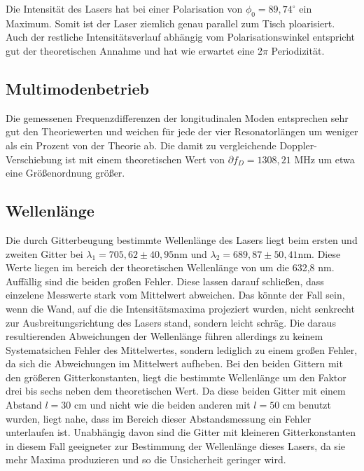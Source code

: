 Die Intensität des Lasers hat bei einer Polarisation von $\phi_0 = 89,74^{\circ}$ ein Maximum.
Somit ist der Laser ziemlich genau parallel zum Tisch ploarisiert. 
Auch der restliche Intensitätsverlauf abhängig vom Polarisationswinkel entspricht gut der theoretischen Annahme 
und hat wie erwartet eine 2$\pi$ Periodizität.


\subsection{Multimodenbetrieb}

Die gemessenen Frequenzdifferenzen der longitudinalen Moden entsprechen sehr gut den Theoriewerten und weichen für jede der 
vier Resonatorlängen um weniger als ein Prozent von der Theorie ab.
Die damit zu vergleichende Doppler-Verschiebung ist mit einem theoretischen Wert von $\partial f_D = 1308,21$ MHz 
um etwa eine Größenordnung größer.


\subsection{Wellenlänge}

Die durch Gitterbeugung bestimmte Wellenlänge des Lasers liegt beim ersten und zweiten Gitter bei 
$\lambda_1 = 705,62 \pm 40,95 \si{\nano\meter}$ und $\lambda_2 = 689,87 \pm 50,41 \si{\nano\meter}$.
Diese Werte liegen im bereich der theoretischen Wellenlänge von um die 632,8 nm.
Auffällig sind die beiden großen Fehler. Diese lassen darauf schließen, dass einzelene Messwerte stark vom Mittelwert abweichen. 
Das könnte der Fall sein, wenn die Wand, auf die die Intensitätsmaxima projeziert wurden, nicht senkrecht zur 
Ausbreitungsrichtung des Lasers stand, sondern leicht schräg. Die daraus resultierenden Abweichungen der Wellenlänge führen allerdings 
zu keinem Systematsichen Fehler des Mittelwertes, sondern lediglich zu einem großen Fehler, da sich die Abweichungen im Mittelwert aufheben. 
Bei den beiden Gittern mit den größeren Gitterkonstanten, liegt die bestimmte Wellenlänge um den Faktor drei bis sechs 
neben dem theoretischen Wert. Da diese beiden Gitter mit einem Abstand $l = 30$ cm und nicht wie die beiden anderen mit $l = 50$ cm 
benutzt wurden, liegt nahe, dass im Bereich dieser Abstandsmessung ein Fehler unterlaufen ist. 
Unabhängig davon sind die Gitter mit kleineren Gitterkonstanten in diesem Fall geeigneter zur Bestimmung der Wellenlänge dieses Lasers, da sie 
mehr Maxima produzieren und so die Unsicherheit geringer wird.


